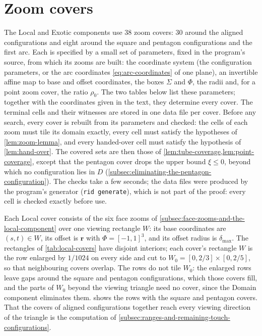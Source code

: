 \section{Zoom covers}\label{app:zoom-covers}

The Local and Exotic components use 38 zoom covers: 30 around the
aligned configurations and eight around the square and pentagon
configurations and the first arc. Each is specified by a small set of
parameters, fixed in the program's source, from which its zooms are built:
the coordinate system (the configuration parameters, or the arc coordinates
\cref{eq:arc-coordinates} of one plane), an invertible affine map to base
and offset coordinates, the boxes $\Sigma$ and $\Phi$, the radii and, for a
point zoom cover, the ratio $\rho_0$. The two tables below list these
parameters; together with the coordinates given in the text, they determine
every cover. The terminal cells and their witnesses are stored in one data
file per cover. Before any search, every cover is rebuilt from its
parameters and checked: the cells of each zoom must tile its domain exactly,
every cell must satisfy the hypotheses of \cref{lem:zoom-lemma}, and every
handed-over cell must satisfy the hypothesis of \cref{lem:hand-over}. The
covered sets are then those of \cref{lem:tube-coverage,lem:point-coverage},
except that the pentagon cover drops the upper bound $\xi\le0$, beyond which
no configuration lies in $D$ (\cref{subsec:eliminating-the-pentagon-configuration}).
The checks take a few seconds; the data files were produced by the
program's generator (\texttt{rid generate}), which is not part of the proof:
every cell is checked exactly before use.

Each Local cover consists of the six face zooms of
\cref{subsec:face-zooms-and-the-local-component} over one viewing rectangle
$W$: its base coordinates are $(s,t)\in W$, its offset is $\mathbf r$ with
$\Phi={[-1,1]}^3$, and its offset radius is $\delta_{\max}$. The rectangles of
\cref{tab:local-covers} have disjoint interiors; each cover's rectangle $W$
is the row enlarged by $1/1024$ on every side and cut to
$W_0=[0,2/3]\times[0,2/5]$, so that neighbouring covers overlap. The rows do
not tile $W_0$: the enlarged rows leave gaps around the square and pentagon
configurations, which those covers fill, and the parts of $W_0$ beyond the
viewing triangle need no cover, since the Domain component eliminates them.  shows the rows with the square and pentagon covers.
That the covers of aligned configurations together reach every viewing
direction of the triangle is the computation of
\cref{subsec:ranges-and-remaining-touch-configurations}.



